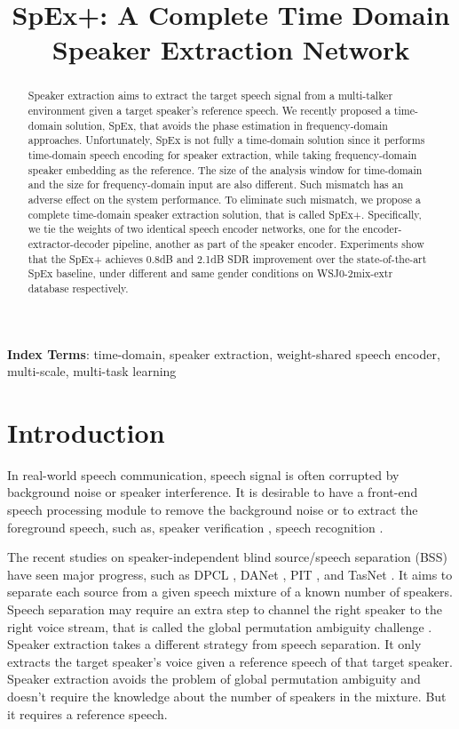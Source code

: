 \documentclass[a4paper]{article}
\title{SpEx+: A Complete Time Domain Speaker Extraction Network}
\begin{document}
\maketitle
\begin{abstract}
Speaker extraction aims to extract the target speech signal from a multi-talker environment given a target speaker's reference speech.
We recently proposed a time-domain solution, SpEx, that avoids the phase estimation in frequency-domain approaches. Unfortunately, SpEx is not fully a time-domain solution since it performs time-domain speech encoding for speaker extraction, while taking frequency-domain speaker embedding as the reference. The size of the analysis window for time-domain and the size for frequency-domain input are also different. Such mismatch has an adverse effect on the system performance. To eliminate such mismatch, we propose a complete time-domain speaker extraction solution, that is called SpEx+.
Specifically, we tie the weights of two identical speech encoder networks, one for the encoder-extractor-decoder pipeline, another as part of the speaker encoder. Experiments show that the SpEx+ achieves 0.8dB and 2.1dB SDR improvement over the state-of-the-art SpEx baseline, under different and same gender conditions on WSJ0-2mix-extr database respectively. 

\end{abstract}
\noindent\textbf{Index Terms}: time-domain, speaker extraction, weight-shared speech encoder, multi-scale, multi-task learning

\section{Introduction}

In real-world speech communication, speech signal is often corrupted by background noise or speaker interference. It is desirable to have a front-end speech processing module to remove the background noise or to extract the foreground speech, such as, speaker verification \cite{rao2019target}, speech recognition \cite{zmolikova2017speaker,delcroix2018single}.


The recent studies on speaker-independent blind source/speech separation (BSS) have seen major progress, such as DPCL  \cite{hershey2016deep,isik2016single,wang2018alternative}, DANet \cite{chen2017deep,luo2018speaker}, PIT \cite{yu2017permutation,kolbaek2017multitalker,xu2018single}, and TasNet \cite{luo2018real,luo2019conv}. It aims to separate each source from a given speech mixture of a known number of speakers. Speech separation may require an extra step to channel the right speaker to the right voice stream, that is called the global permutation ambiguity challenge \cite{spex2020}. Speaker extraction takes a different strategy from speech separation. It only extracts the target speaker's voice given a reference speech of that target speaker. Speaker extraction avoids the problem of global permutation ambiguity and doesn't require the knowledge about the number of speakers in the mixture. But it requires a reference speech.
\end{document}

